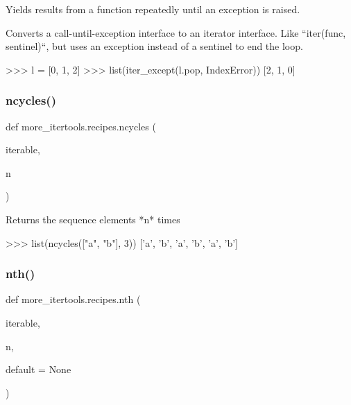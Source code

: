 \begin{DoxyVerb}Yields results from a function repeatedly until an exception is raised.

Converts a call-until-exception interface to an iterator interface.
Like ``iter(func, sentinel)``, but uses an exception instead of a sentinel
to end the loop.

    >>> l = [0, 1, 2]
    >>> list(iter_except(l.pop, IndexError))
    [2, 1, 0]\end{DoxyVerb}
 \mbox{\label{namespacemore__itertools_1_1recipes_ab7e0f302ed571cc4d184ab2d8681c3fa}} 
\subsubsection{\texorpdfstring{ncycles()}{ncycles()}}
{\footnotesize\ttfamily def more\+\_\+itertools.\+recipes.\+ncycles (\begin{DoxyParamCaption}\item[{}]{iterable,  }\item[{}]{n }\end{DoxyParamCaption})}

\begin{DoxyVerb}Returns the sequence elements *n* times

    >>> list(ncycles(["a", "b"], 3))
    ['a', 'b', 'a', 'b', 'a', 'b']\end{DoxyVerb}
 \mbox{\label{namespacemore__itertools_1_1recipes_a436b5ed8f5e2d2a013defa73efe58e96}} 
\subsubsection{\texorpdfstring{nth()}{nth()}}
{\footnotesize\ttfamily def more\+\_\+itertools.\+recipes.\+nth (\begin{DoxyParamCaption}\item[{}]{iterable,  }\item[{}]{n,  }\item[{}]{default = {\ttfamily None} }\end{DoxyParamCaption})}

